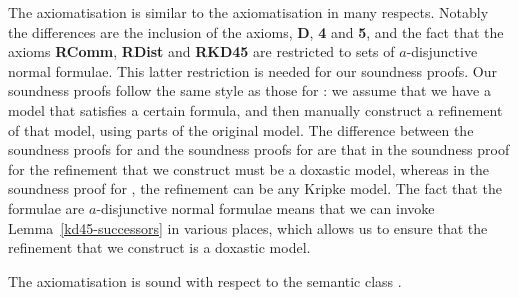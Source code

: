 The axiomatisation \axiomKDF{} is similar to the axiomatisation \axiomKF{} in
many respects. Notably the differences are the inclusion of the \axiomKF{}
axioms, {\bf D}, {\bf 4} and {\bf 5}, and the fact that the axioms {\bf RComm},
{\bf RDist} and {\bf RKD45} are restricted to sets of $a$-disjunctive normal
formulae. This latter restriction is needed for our soundness proofs. Our
soundness proofs follow the same style as those for \axiomKF{}: we assume that
we have a model that satisfies a certain formula, and then manually construct a
refinement of that model, using parts of the original model. The difference
between the soundness proofs for \axiomKF{} and the soundness proofs for
\axiomKDF{} are that in the soundness proof for \axiomKDF{} the refinement that
we construct must be a doxastic model, whereas in the soundness proof for
\axiomKF{}, the refinement can be any Kripke model.  The fact that the formulae
are $a$-disjunctive normal formulae means that we can invoke
Lemma~\ref{kd45-successors} in various places, which allows us to ensure that
the refinement that we construct is a doxastic model.

\begin{lemma}\label{kd45-sound}
The axiomatisation \axiomKDF{} is sound with respect to the semantic class
\classKD{}.
\end{lemma}

